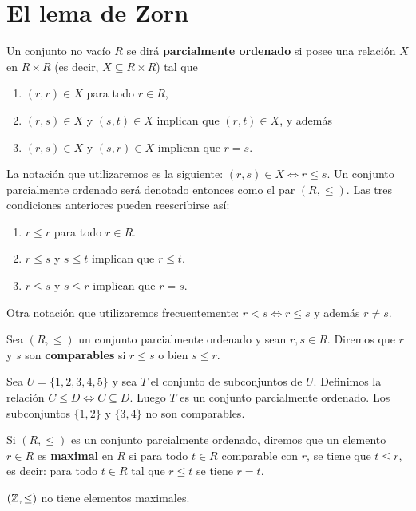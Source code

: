 \chapter{El lema de Zorn}

Un conjunto no vacío $R$ se dirá \textbf{parcialmente ordenado} si posee una relación $X$ en $R\times R$ (es decir, $X\subseteq R\times R$)
tal que 
\begin{enumerate}   	
\item $(r,r)\in X$ para todo $r\in R$,
\item $(r,s)\in X$ y $(s,t)\in X$ implican que $(r,t)\in X$, y además
\item $(r,s)\in X$ y $(s,r)\in X$ implican que $r=s$.
\end{enumerate}

La notación que utilizaremos es la siguiente: $(r,s)\in X\Longleftrightarrow r\leq s$. Un conjunto parcialmente ordenado será denotado entonces como el par $(R,\leq)$. Las 
tres condiciones anteriores pueden reescribirse así:
\begin{enumerate}
\item $r\leq r$ para todo $r\in R$.
\item $r\leq s$ y $s\leq t$ implican que $r\leq t$.
\item $r\leq s$ y $s\leq r$ implican que $r=s$.
\end{enumerate}

Otra notación que utilizaremos frecuentemente: $r<s\Longleftrightarrow r\leq s$ y además $r\ne s$.

Sea $(R,\leq)$ un conjunto parcialmente ordenado y sean $r,s\in R$. Diremos que $r$ y $s$ son \textbf{comparables}
si $r\leq s$ o bien $s\leq r$. 	

\begin{example}
Sea $U=\{1,2,3,4,5\}$ y sea $T$ el conjunto de subconjuntos de $U$. Definimos 
la relación $C\leq D\Longleftrightarrow C\subseteq D$. Luego $T$ es un conjunto parcialmente ordenado. Los
subconjuntos $\{1,2\}$ y $\{3,4\}$ no son comparables. 
\end{example}

Si $(R,\leq)$ es un conjunto parcialmente ordenado, diremos que un elemento $r\in R$ es \textbf{maximal} en $R$ 
si para todo $t\in R$ comparable con $r$, se tiene que $t\leq r$, es decir: para todo $t\in R$ tal que $r\leq t$ se tiene $r=t$. 	

\begin{example}
$(\mathbb{Z},\leq)$ no tiene elementos maximales.
\end{example}

